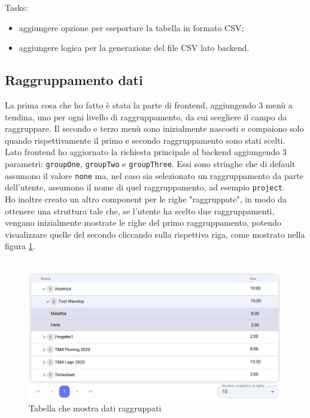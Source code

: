 \noindent Tasks:
\begin{itemize}
  \item aggiungere opzione per eseportare la tabella in formato CSV;
  \item aggiungere logica per la generazione del file CSV lato backend.
\end{itemize}


\subsection{Raggruppamento dati}
La prima cosa che ho fatto è stata la parte di frontend, aggiungendo 3 menù a tendina, uno per ogni livello di raggruppamento, da cui scegliere il campo da raggruppare. Il secondo e terzo menù sono inizialmente nascosti e compaiono solo quando rispettivamente il primo e secondo raggruppamento sono stati scelti.\\
Lato frontend ho aggiornato la richiesta principale al backend aggiungendo 3 parametri: \texttt{groupOne}, \texttt{groupTwo} e \texttt{groupThree}. Essi sono stringhe che di default assumono il valore \texttt{none} ma, nel caso sia selezionato un raggruppamento da parte dell'utente, assumono il nome di quel raggruppamento, ad esempio \texttt{project}.\\
Ho inoltre creato un altro component per le righe "raggruppate", in modo da ottenere una struttura tale che, se l'utente ha scelto due raggruppamenti, vengano inizialmente mostrate le righe del primo raggruppamento, potendo visualizzare quelle del secondo cliccando sulla rispettiva riga, come mostrato nella figura \ref{fig:report_groupedtable}.\\\\
\begin{figure}[H]
	\includegraphics[width = \textwidth]{immagini/reports table groupings.png}
	\caption{Tabella che mostra dati raggruppati}
	\label{fig:report_groupedtable}
\end{figure}
